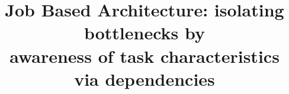 \documentclass[conference]{ieee/IEEEtran}
\begin{document}
%
\title{Job Based Architecture: isolating bottlenecks by \\
awareness of task characteristics via dependencies}


\author{
}


% 








\maketitle
\end{document}
